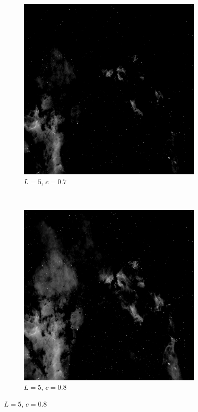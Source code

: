 \documentclass{article}
\begin{document}
\begin{enumerate}[label=(\alph*)]
\begin{figure}[!htb]
\begin{subfigure}[b]{0.3\textwidth}
            \includegraphics[width=\textwidth]{img/C_5_07.png}
            \caption{$L = 5$, $c = 0.7$}
        \end{subfigure}
        ~
        \begin{subfigure}[b]{0.3\textwidth}
            \includegraphics[width=\textwidth]{img/C_5_08.png}
            \caption{$L = 5$, $c = 0.8$}
        \end{subfigure}
        

\end{figure}
\end{enumerate}
\end{document}
